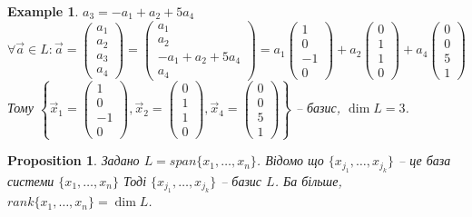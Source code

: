 \documentclass[a4paper, 10pt]{article}
\theoremstyle{theoremdd}
\newtheorem{example}[theorem]{Example}
\newtheorem{proposition}[theorem]{Proposition}
\begin{document}
\begin{example}
	$a_3 = -a_1 + a_2 + 5a_4$\\
	$\forall \vec{a} \in L: \vec{a} = \begin{pmatrix} a_1 \\ a_2 \\ a_3 \\ a_4 \end{pmatrix} = \begin{pmatrix} a_1 \\ a_2 \\ -a_1 + a_2 + 5a_4 \\ a_4 \end{pmatrix} = a_1 \begin{pmatrix} 1 \\ 0 \\ -1 \\ 0 \end{pmatrix} + a_2 \begin{pmatrix} 0 \\ 1 \\ 1 \\ 0 \end{pmatrix} + a_4 \begin{pmatrix} 0 \\ 0 \\ 5 \\ 1 \end{pmatrix}$\\
	Тому $\left\{\vec{x}_1 = \begin{pmatrix} 1 \\ 0 \\ -1 \\ 0\end{pmatrix}, \vec{x}_2 = \begin{pmatrix} 0 \\ 1 \\ 1 \\ 0\end{pmatrix}, \vec{x}_4 = \begin{pmatrix} 0 \\ 0 \\ 5 \\ 1\end{pmatrix} \right\}$ -- базис, $\dim{L} = 3$.
	\end{example}
	
	\iffalse
	\begin{proposition}
	Задано $L = span\{x_1,\dots,x_n\}$. Відомо що $\{x_{j_1},\dots,x_{j_k}\}$ -- це база системи $\{x_1,\dots,x_n\}$ Тоді $\{x_{j_1},\dots,x_{j_k}\}$ -- базис $L$. Ба більше, $rank\{x_1,\dots,x_n\} = \dim L$.
	\end{proposition}
	
\end{document}
